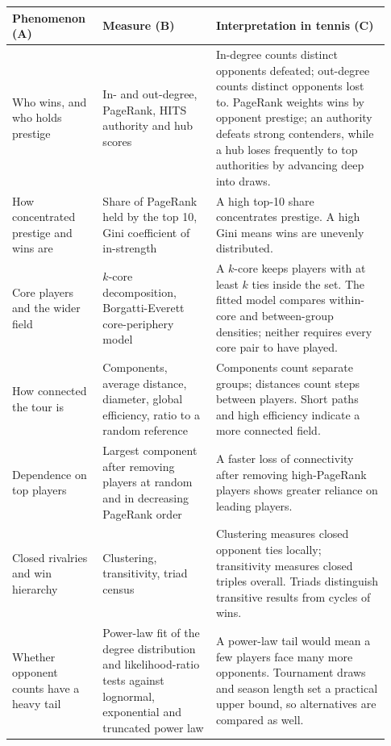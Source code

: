 \begin{tabular}{@{}>{\raggedright\arraybackslash}p{0.22\linewidth}>{\raggedright\arraybackslash}p{0.28\linewidth}>{\raggedright\arraybackslash}p{0.43\linewidth}@{}}
\toprule
Phenomenon (A) & Measure (B) & Interpretation in tennis (C) \\
\midrule
Who wins, and who holds prestige & In- and out-degree, PageRank, HITS authority and hub scores & In-degree counts distinct opponents defeated; out-degree counts distinct opponents lost to. PageRank weights wins by opponent prestige; an authority defeats strong contenders, while a hub loses frequently to top authorities by advancing deep into draws. \\
\addlinespace[3pt]
How concentrated prestige and wins are & Share of PageRank held by the top 10, Gini coefficient of in-strength & A high top-10 share concentrates prestige. A high Gini means wins are unevenly distributed. \\
\addlinespace[3pt]
Core players and the wider field & $k$-core decomposition, Borgatti-Everett core-periphery model & A $k$-core keeps players with at least $k$ ties inside the set. The fitted model compares within-core and between-group densities; neither requires every core pair to have played. \\
\addlinespace[3pt]
How connected the tour is & Components, average distance, diameter, global efficiency, ratio to a random reference & Components count separate groups; distances count steps between players. Short paths and high efficiency indicate a more connected field. \\
\addlinespace[3pt]
Dependence on top players & Largest component after removing players at random and in decreasing PageRank order & A faster loss of connectivity after removing high-PageRank players shows greater reliance on leading players. \\
\addlinespace[3pt]
Closed rivalries and win hierarchy & Clustering, transitivity, triad census & Clustering measures closed opponent ties locally; transitivity measures closed triples overall. Triads distinguish transitive results from cycles of wins. \\
\addlinespace[3pt]
Whether opponent counts have a heavy tail & Power-law fit of the degree distribution and likelihood-ratio tests against lognormal, exponential and truncated power law & A power-law tail would mean a few players face many more opponents. Tournament draws and season length set a practical upper bound, so alternatives are compared as well. \\

\end{tabular}
